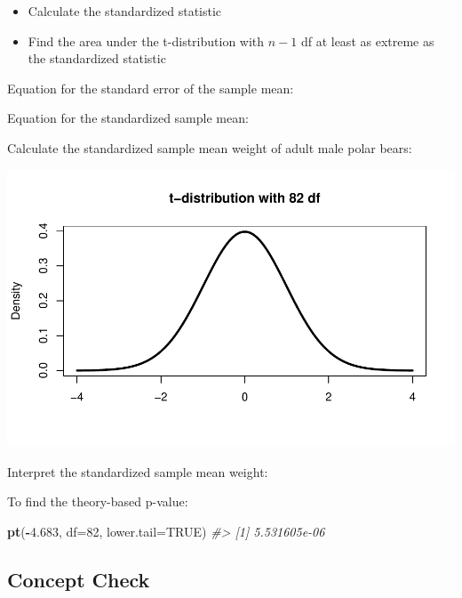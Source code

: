 \documentclass[
]{report}
\newenvironment{Shaded}{\begin{snugshade}}{\end{snugshade}}
\newcommand{\AttributeTok}[1]{\textcolor[rgb]{0.13,0.29,0.53}{#1}}
\newcommand{\CommentTok}[1]{\textcolor[rgb]{0.56,0.35,0.01}{\textit{#1}}}
\newcommand{\ConstantTok}[1]{\textcolor[rgb]{0.56,0.35,0.01}{#1}}
\newcommand{\DecValTok}[1]{\textcolor[rgb]{0.00,0.00,0.81}{#1}}
\newcommand{\FloatTok}[1]{\textcolor[rgb]{0.00,0.00,0.81}{#1}}
\newcommand{\FunctionTok}[1]{\textcolor[rgb]{0.13,0.29,0.53}{\textbf{#1}}}
\newcommand{\NormalTok}[1]{#1}
\newcommand{\SpecialCharTok}[1]{\textcolor[rgb]{0.81,0.36,0.00}{\textbf{#1}}}
\begin{document}
\begin{itemize}
\item
  Calculate the standardized statistic
\item
  Find the area under the t-distribution with \(n - 1\) df at least as extreme as the standardized statistic
\end{itemize}

Equation for the standard error of the sample mean:

\vspace{0.5in}

Equation for the standardized sample mean:

\vspace{0.5in}

Calculate the standardized sample mean weight of adult male polar bears:

\vspace{0.4in}

\begin{center}\includegraphics[width=0.7\linewidth]{06-VN06-EDAonemeanSim_files/figure-latex/pvaluepb-1} \end{center}

Interpret the standardized sample mean weight:

\vspace{0.8in}

To find the theory-based p-value:

\begin{Shaded}
\begin{Highlighting}[]
\FunctionTok{pt}\NormalTok{(}\SpecialCharTok{{-}}\FloatTok{4.683}\NormalTok{, }\AttributeTok{df=}\DecValTok{82}\NormalTok{, }\AttributeTok{lower.tail=}\ConstantTok{TRUE}\NormalTok{)}
\CommentTok{\#\textgreater{} [1] 5.531605e{-}06}
\end{Highlighting}
\end{Shaded}

\subsection{Concept Check}\label{concept-check}
\end{document}
